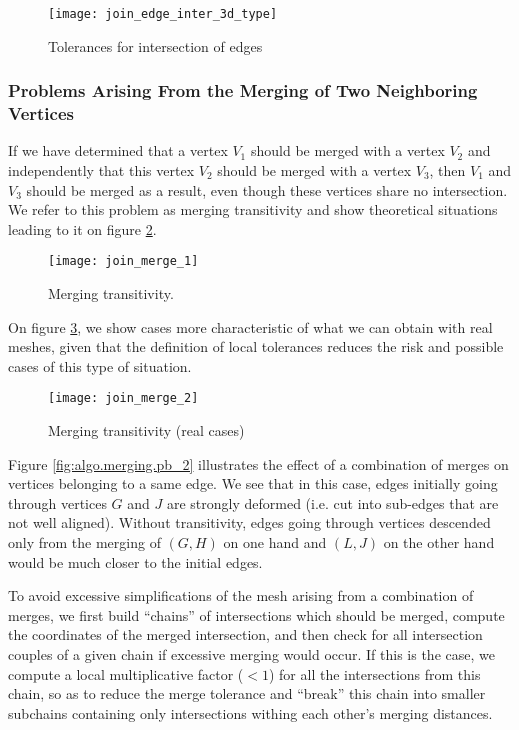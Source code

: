 \begin{figure}[!h]
\centerline{
\texttt{[image: join\_edge\_inter\_3d\_type]}}
\caption{Tolerances for intersection of edges}
\label{fig:algo.join.edgeint_type}
\end{figure}

\subsubsection*{Problems Arising From the Merging of Two Neighboring Vertices
                \label{sec:join.pb_merge}}

If we have determined that a vertex $V_1$ should be merged with a
vertex $V_2$ and independently that this vertex $V_2$ should be
merged with a vertex $V_3$, then $V_1$ and $V_3$ should be
merged as a result, even though these vertices share no intersection.
We refer to this problem as merging transitivity and show
theoretical situations leading to it on figure \ref{fig:algo.merging.pb}.

\begin{figure}[!h]
\centerline{
\texttt{[image: join\_merge\_1]}}
\caption{Merging transitivity.}
\label{fig:algo.merging.pb}
\end{figure}

On figure \ref{fig:algo.merging.pb_1}, we show cases more
characteristic of what we can obtain with real meshes, given
that the definition of local tolerances reduces the risk and
possible cases of this type of situation.

\begin{figure}[!h]
\centerline{
\texttt{[image: join\_merge\_2]}}
\caption{Merging transitivity (real cases)}
\label{fig:algo.merging.pb_1}
\end{figure}

Figure \ref{fig:algo.merging.pb_2} illustrates the effect of
a combination of merges on vertices belonging to a same edge.
We see that in this case, edges initially going through
vertices $G$ and $J$ are strongly deformed (i.e. cut into
sub-edges that are not well aligned). Without transitivity,
edges going through vertices descended only from the merging
of $(G, H)$ on one hand and $(L, J)$ on the other hand
would be much closer to the initial edges.

To avoid excessive simplifications of the mesh arising from a
combination of merges, we first build ``chains'' of intersections
which should be merged, compute the coordinates of the merged
intersection, and then check for all intersection couples
of a given chain if excessive merging would occur. If this is the case,
we compute a local multiplicative factor ($< 1$) for all the
intersections from this chain, so as to reduce the merge tolerance
and ``break'' this chain into smaller subchains containing only
intersections withing each other's merging distances.

